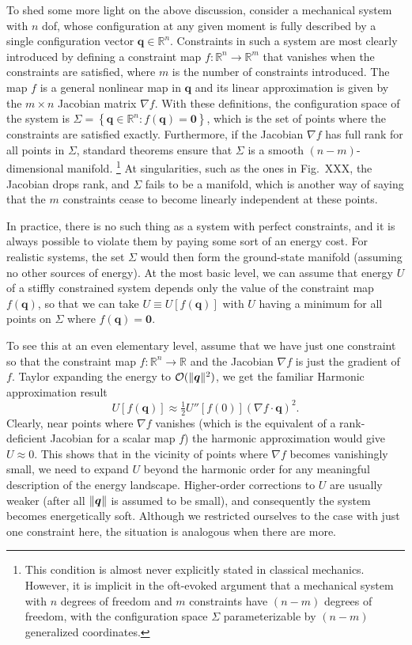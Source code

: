 To shed some more light on the above discussion, consider a mechanical system with $n$ \ac{dof}, whose configuration at any given moment is fully described by a single configuration vector $\bm{q} \in \mathbb{R}^{n}$.
Constraints in such a system are most clearly introduced by defining a constraint map $f: \mathbb{R}^{n} \to \mathbb{R}^{m}$
that vanishes when the constraints are satisfied, where $m$ is the number of constraints introduced.
The map $f$ is a general nonlinear map in $\bm{q}$ and its linear approximation is given by the $m\times n$ Jacobian matrix $\nabla f$.
With these definitions, the configuration space of the system is $\Sigma = \left\{\bm{q} \in \mathbb{R}^{n} : f(\bm{q}) = \bm{0}\right\}$, which is the set of points where the constraints are satisfied exactly.
Furthermore, if the Jacobian $\nabla f$ has full rank for all points in $\Sigma$, standard theorems ensure that $\Sigma$ is a smooth $(n-m)$-dimensional manifold.%
\footnote{This condition is almost never explicitly stated in classical mechanics.
However, it is implicit in the oft-evoked argument that a mechanical system with $n$ degrees of freedom and $m$ constraints have $(n-m)$ degrees of freedom, with the configuration space $\Sigma$ parameterizable by $(n-m)$ generalized coordinates.}
At singularities, such as the ones in Fig.~XXX, the Jacobian drops rank, and $\Sigma$ fails to be a manifold,
which is another way of saying that the $m$ constraints cease to become linearly independent at these points.

In practice, there is no such thing as a system with perfect constraints, and it is always possible to violate them by paying some sort of an energy cost.
For realistic systems, the set $\Sigma$ would then form the ground-state manifold (assuming no other sources of energy).
At the most basic level, we can assume that energy $U$ of a stiffly constrained system depends only the value of the constraint map $f(\bm{q})$, so that we can take $U \equiv U[f(\bm{q})]$ with $U$ having a minimum for all points on $\Sigma$ where $f(\bm{q}) = \bm{0}$.

To see this at an even elementary level, assume that we have just one constraint so that the constraint map $f: \mathbb{R}^{n} \to \mathbb{R}$ and the Jacobian $\nabla f$ is just the gradient of $f$.
Taylor expanding the energy to $\mathcal{O}(\lVert\bm{q}\rVert^{2})$, we get the familiar Harmonic approximation result
%
\begin{equation}
  U[f(\bm{q})] \approx \tfrac{1}{2}U''\left[f(0)\right]\left(\nabla f\cdot \bm{q}\right)^{2}.
\end{equation}
%
Clearly, near points where $\nabla f$ vanishes (which is the equivalent of a rank-deficient Jacobian for a scalar map $f$) the harmonic approximation would give $U \approx 0$.
This shows that in the vicinity of points where $\nabla f$ becomes vanishingly small, we need to expand $U$ beyond the harmonic order for any meaningful description of the energy landscape.
Higher-order corrections to $U$ are usually weaker (after all $\lVert\bm{q}\rVert$ is assumed to be small), and consequently the system becomes energetically soft.
Although we restricted ourselves to the case with just one constraint here, the situation is analogous when there are more.



